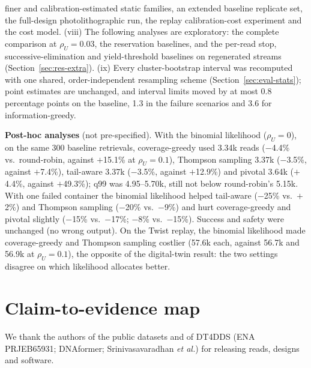 \documentclass[acmsmall,screen]{acmart}
\begin{document}
finer and calibration-estimated static families, an extended baseline replicate set, the full-design
photolithographic run, the replay calibration-cost experiment and the cost model.  (viii) The following analyses
are exploratory: the complete comparison at $\rho_U{=}0.03$, the reservation
baselines, and the per-read stop, successive-elimination and yield-threshold baselines on regenerated
streams (Section~\ref{sec:res-extra}).  (ix) Every cluster-bootstrap interval was
recomputed with one shared, order-independent resampling scheme (Section~\ref{sec:eval-stats}); point
estimates are unchanged, and interval limits moved by at most 0.8 percentage points on the baseline,
1.3 in the failure scenarios and 3.6 for information-greedy.

\textbf{Post-hoc analyses} (not pre-specified).  With the binomial likelihood ($\rho_U{=}0$), on the same
300 baseline retrievals, coverage-greedy used 3.34k reads ($-$4.4\% vs.\ round-robin, against $+$15.1\%
at $\rho_U{=}0.1$), Thompson sampling 3.37k ($-$3.5\%, against $+$7.4\%), tail-aware 3.37k ($-$3.5\%,
against $+$12.9\%) and pivotal 3.64k ($+$4.4\%, against $+$49.3\%); q99 was 4.95--5.70k, still not below
round-robin's 5.15k.  With one failed container the binomial likelihood helped tail-aware ($-$25\% vs.\
$+$2\%) and Thompson sampling ($-$20\% vs.\ $-$9\%) and hurt coverage-greedy and pivotal slightly
($-$15\% vs.\ $-$17\%; $-$8\% vs.\ $-$15\%).  Success and safety were unchanged (no wrong output).  On the
Twist replay, the binomial likelihood made coverage-greedy and Thompson sampling costlier (57.6k each,
against 56.7k and 56.9k at $\rho_U{=}0.1$), the opposite of the digital-twin result: the two settings
disagree on which likelihood allocates better.

\section{Claim-to-evidence map}\label{supp:evidence}


\begin{acks}
We thank the authors of the public datasets and of DT4DDS (ENA PRJEB65931; DNAformer;
Srinivasavaradhan \emph{et al.}) for releasing reads, designs and software.
\end{acks}



\end{document}
